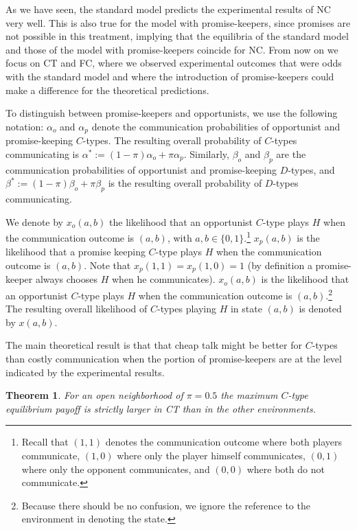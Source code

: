 \documentclass[12pt]{article}
\newtheorem{theorem}{Theorem}
\theoremstyle{break}
\begin{document}
As we have seen, the standard model predicts the experimental results of NC very well. This is also true for the model with promise-keepers, since promises are not possible in this treatment, implying that the equilibria of the standard model and those of the model with promise-keepers coincide for NC. From now on we focus on CT and FC, where we observed experimental outcomes that were odds with the standard model and where the introduction of promise-keepers could make a difference for the theoretical predictions.

To distinguish between promise-keepers and opportunists, we use the following notation: $\alpha_o$ and  $\alpha_p$ denote the communication probabilities of opportunist and promise-keeping $C$-types. The resulting overall probability of $C$-types communicating is $\alpha^*:=(1-\pi) \alpha_o+ \pi\alpha_p$.  Similarly, $\beta_o$ and $\beta_p$ are the communication probabilities of opportunist and promise-keeping $D$-types, and $\beta^*:=(1-\pi) \beta_o+ \pi \beta_p$ is the resulting overall probability of $D$-types communicating.

We denote by $x_o (a,b)$ the likelihood that an opportunist $C$-type plays $H$ when the communication outcome is $(a,b)$, with $a,b\in\{0,1\}$.\footnote{%
Recall that $(1,1)$ denotes the communication outcome where both players communicate, $(1,0)$ where only the player himself communicates, $(0,1)$ where only the opponent communicates, and $(0,0)$ where both do not communicate.}
$x_p(a,b)$ is the likelihood that a promise keeping $C$-type plays $H$ when the communication outcome is $(a,b)$. Note that $x_p(1,1)= x_p(1,0) = 1$ (by definition a promise-keeper always chooses $H$ when he communicates). $x_o(a,b)$ is the likelihood that an opportunist $C$-type plays $H$ when the communication outcome is $(a,b)$.\footnote{%
Because there should be no confusion, we ignore the reference to the environment in denoting the state.} The resulting overall likelihood of $C$-types playing $H$ in state $(a,b)$ is denoted by $x(a,b)$. 

The main theoretical result is that that cheap talk might be better for $C$-types than costly communication when the portion of promise-keepers are at the level indicated by the experimental results.

\begin{theorem}\label{prop:CT-dom-FC}
	For an open neighborhood of $\pi=0.5$ the maximum $C$-type equilibrium payoff is strictly larger in CT than in the other environments.
\end{theorem}
\end{document}
